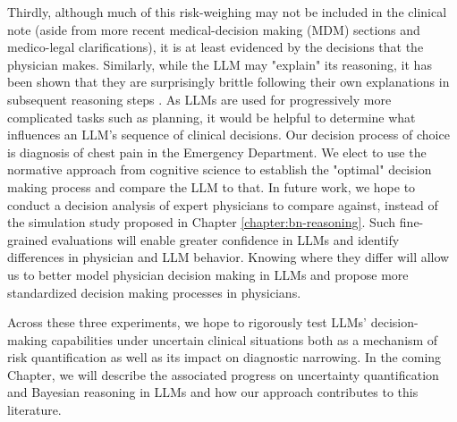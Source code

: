 Thirdly, although much of this risk-weighing may not be included in the clinical note (aside from more recent medical-decision making (MDM) sections and medico-legal clarifications), it is at least evidenced by the decisions that the physician makes. Similarly, while the LLM may "explain" its reasoning, it has been shown that they are surprisingly brittle following their own explanations in subsequent reasoning steps \cite{chenModelsExplainThemselves2024}. As LLMs are used for progressively more complicated tasks such as planning, it would be helpful to determine what influences an LLM's sequence of clinical decisions. Our decision process of choice is diagnosis of chest pain in the Emergency Department. We elect to use the normative approach from cognitive science to establish the "optimal" decision making process and compare the LLM to that. In future work, we hope to conduct a decision analysis of expert physicians to compare against, instead of the simulation study proposed in Chapter \ref{chapter:bn-reasoning}. Such fine-grained evaluations will enable greater confidence in LLMs and identify differences in physician and LLM behavior. Knowing where they differ will allow us to better model physician decision making in LLMs and propose more standardized decision making processes in physicians.

Across these three experiments, we hope to rigorously test LLMs' decision-making capabilities under uncertain clinical situations both as a mechanism of risk quantification as well as its impact on diagnostic narrowing. In the coming Chapter, we will describe the associated progress on uncertainty quantification and Bayesian reasoning in LLMs and how our approach contributes to this literature. 
